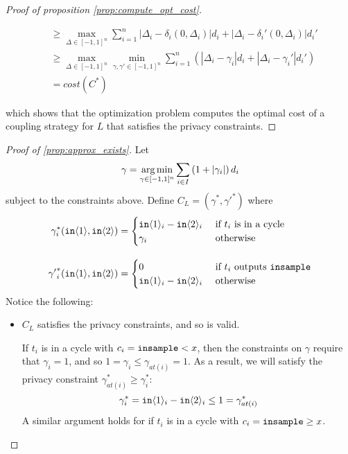 \begin{proof}[Proof of proposition \ref{prop:compute_opt_cost}]
\begin{enumerate}
\begin{align*}
            &\geq \max_{\Delta \in [-1, 1]^n} \sum_{i = 1}^n  |\Delta_i - \delta_i(0, \Delta_i)| d_i + |\Delta_i - \delta_i'(0, \Delta_i)|d_i' \\
            &\geq \max_{\Delta \in [-1, 1]^n} \min_{\gamma, \gamma' \in [-1, 1]^n} \sum_{i = 1}^n \left(|\Delta_i - \gamma_i| d_i + |\Delta_i - \gamma_i'|d_i' \right)\\
            &= cost(C^*)
        \end{align*}
    \end{enumerate}
    which shows that the optimization problem computes the optimal cost of a coupling strategy for $L$ that satisfies the privacy constraints.
\end{proof}


\begin{proof}[Proof of \ref{prop:approx_exists}]
    Let 
    \[\gamma = \operatorname*{arg\,min}_{\gamma \in [-1, 1]^n} \sum_{i \in I} \left(1 + |\gamma_i| \right) d_i\]
    subject to the constraints above. Define $C_L = (\gamma^*, {\gamma'}^*)$ where
    \begin{align*}
        \gamma_i^*(\texttt{in}\langle1 \rangle, \texttt{in}\langle2 \rangle) &= \begin{cases}
            \texttt{in}\langle1 \rangle_i - \texttt{in}\langle2 \rangle_i &\text{ if } t_i \text{ is in a cycle} \\
            \gamma_i &\text{ otherwise}
        \end{cases} \\[1em]
        {\gamma'}_i^*(\texttt{in}\langle1 \rangle, \texttt{in}\langle2 \rangle) &= \begin{cases}
            0 &\text{ if } t_i \text{ outputs \texttt{insample}} \\
            \texttt{in}\langle1 \rangle_i - \texttt{in}\langle2 \rangle_i &\text{ otherwise}
        \end{cases}
    \end{align*}
    Notice the following: 

    \begin{itemize}
        \item $C_L$ satisfies the privacy constraints, and so is valid.
        
        If $t_i$ is in a cycle with $c_i = \texttt{insample} < x$, then the constraints on $\gamma$ require that $\gamma_i = 1$, and so $1 = \gamma_i \leq \gamma_{at(i)} = 1$. As a result, we will satisfy the privacy constraint $\gamma_{at(i)}^* \geq \gamma_i^*$: 
        \[\gamma_i^* = \texttt{in}\langle1 \rangle_i - \texttt{in}\langle2 \rangle_i \leq 1 = \gamma_{at(i)}^*\]
        A similar argument holds for if $t_i$ is in a cycle with $c_i = \texttt{insample}\geq x$.


\end{itemize}
\end{proof}
